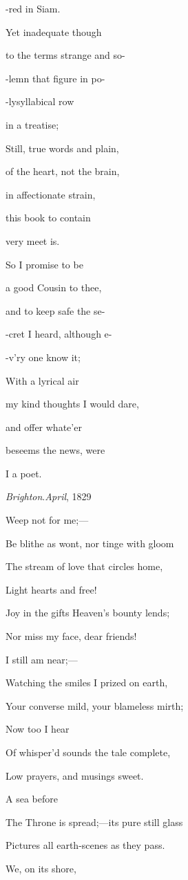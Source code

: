 -red in
Siam.

Yet inadequate though

to the terms strange and so-

-lemn that figure in po-

-lysyllabical row

in a
treatise; 

Still, true words and plain,

of the heart, not the brain,

in affectionate strain,

this book to contain

very
meet is.

So I promise to be

a good Cousin to thee,

and to keep safe the se-

-cret I heard, although e-

-v'ry
one know it;

With a lyrical air

my kind thoughts I would dare,

and offer whate'er

beseems the news, were

I a
poet.

\emph{Brighton}.\emph{April}, 1829


Weep not for me;—

Be blithe as wont, nor tinge with gloom

The stream of love that circles home,

Light hearts and free!

Joy in the gifts Heaven’s bounty lends;

Nor miss my face, dear friends!

I still am near;—

Watching the smiles I prized on earth,

Your converse mild, your blameless mirth;

Now too I hear

Of whisper’d sounds the tale complete,

Low prayers, and musings sweet. 

A sea before

The Throne is spread;—its pure still glass

Pictures all earth-scenes as they pass.

We, on its shore,

